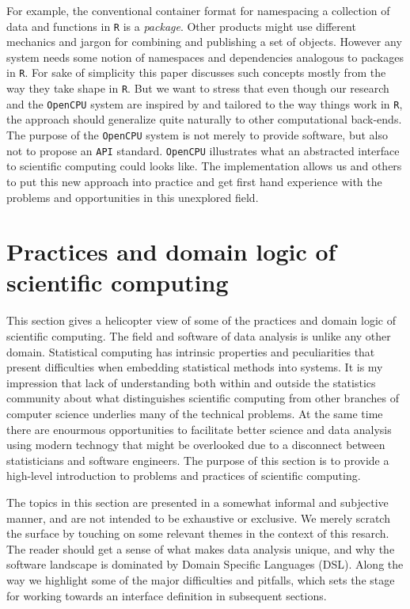 \documentclass{article}
\newcommand{\R}{\texttt{R}\xspace}
\newcommand{\API}{\texttt{API}\xspace}
\newcommand{\OpenCPU}{\texttt{OpenCPU}\xspace}
\begin{document}
For example, the conventional container format for namespacing a collection of data and functions in \R is a \emph{package}. Other products might use different mechanics and jargon for combining and publishing a set of objects. However any system needs some notion of namespaces and dependencies analogous to packages in \R. For sake of simplicity this paper discusses such concepts mostly from the way they take shape in \R. But we want to stress that even though our research and the \OpenCPU system are inspired by and tailored to the way things work in \R, the approach should generalize quite naturally to other computational back-ends. The purpose of the \OpenCPU system is not merely to provide software, but also not to propose an \API standard. \OpenCPU illustrates what an abstracted interface to scientific computing could looks like. The implementation allows us and others to put this new approach into practice and get first hand experience with the problems and opportunities in this unexplored field. 




\section{Practices and domain logic of scientific computing}

This section gives a helicopter view of some of the practices and domain logic of scientific computing. The field and software of data analysis is unlike any other domain. Statistical computing has intrinsic properties and peculiarities that present difficulties when embedding statistical methods into systems. It is my impression that lack of understanding both within and outside the statistics community about what distinguishes scientific computing from other branches of computer science underlies many of the technical problems. At the same time there are enourmous opportunities to facilitate better science and data analysis using modern technogy that might be overlooked due to a disconnect between statisticians and software engineers. The purpose of this section is to provide a high-level introduction to problems and practices of scientific computing.

The topics in this section are presented in a somewhat informal and subjective manner, and are not intended to be exhaustive or exclusive. We merely scratch the surface by touching on some relevant themes in the context of this resarch. The reader should get a sense of what makes data analysis unique, and why the software landscape is dominated by Domain Specific Languages (DSL). Along the way we highlight some of the major difficulties and pitfalls, which sets the stage for working towards an interface definition in subsequent sections.
\end{document}
